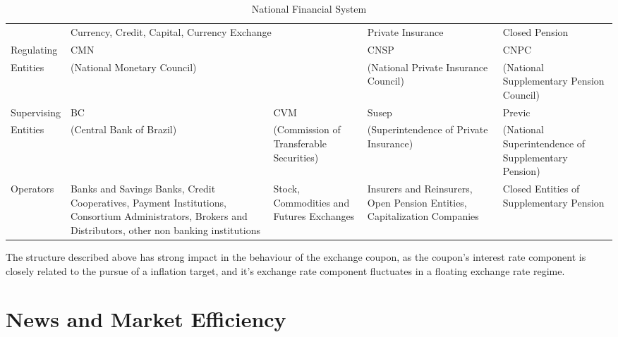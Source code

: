 \documentclass[cic,tc, english]{iiufrgs}
\begin{document}
    \begin{table}[H]
        \caption{National Financial System}
        \label{tab:sistemanacional}
        \centering
        \begin{tabular}{lp{2.3cm}|p{2.3cm}|p{2.3cm}|p{2.3cm}}
             & \multicolumn{2}{p{4.6cm}||}{Currency, Credit, Capital, Currency Exchange} & \multicolumn{1}{l||}{Private Insurance} & \multicolumn{1}{l}{Closed Pension} \\ \cline{2-5} 
            \multicolumn{1}{l|}{Regulating} & \multicolumn{2}{l||}{CMN} & \multicolumn{1}{p{2.3cm}||}{CNSP} & \multicolumn{1}{p{2.3cm}|}{CNPC} \\
            \multicolumn{1}{l|}{Entities} & \multicolumn{2}{l||}{(National Monetary Council)} & \multicolumn{1}{p{2.75cm}||}{(National Private Insurance Council)} & \multicolumn{1}{p{2.3cm}|}{(National Supplementary Pension Council)} \\ \hline
            \multicolumn{1}{l|}{Supervising} & \multicolumn{1}{p{2.3cm}||}{BC} & \multicolumn{1}{p{2.3cm}||}{CVM} & \multicolumn{1}{p{2.3cm}||}{Susep} & \multicolumn{1}{p{2.3cm}|}{Previc} \\
            \multicolumn{1}{l|}{Entities} & \multicolumn{1}{p{2.3cm}||}{(Central Bank of Brazil)} & \multicolumn{1}{p{2.3cm}||}{(Commission of Transferable Securities)} & \multicolumn{1}{p{2.75cm}||}{(Superintendence of Private Insurance)} & \multicolumn{1}{p{2.3cm}|}{(National Superintendence of Supplementary Pension)} \\ \hline
            \multicolumn{1}{l|}{Operators} & \multicolumn{1}{p{2.3cm}||}{Banks and Savings Banks,  Credit Cooperatives, Payment Institutions, Consortium Administrators, Brokers and Distributors, other non banking institutions} & \multicolumn{1}{p{2.3cm}||}{Stock, Commodities and Futures Exchanges} & \multicolumn{1}{p{2.75cm}||}{Insurers and Reinsurers, Open Pension Entities, Capitalization Companies} & \multicolumn{1}{p{2.3cm}|}{Closed Entities of Supplementary Pension} \\ \cline{2-5} 
        \end{tabular}
    \end{table}

    The structure described above has strong impact in the behaviour of the exchange coupon, as the coupon's interest rate component is closely related to the pursue of a inflation target, and it's exchange rate component fluctuates in a floating exchange rate regime.


\chapter{News and Market Efficiency} \label{chapter_literature}
\end{document}
